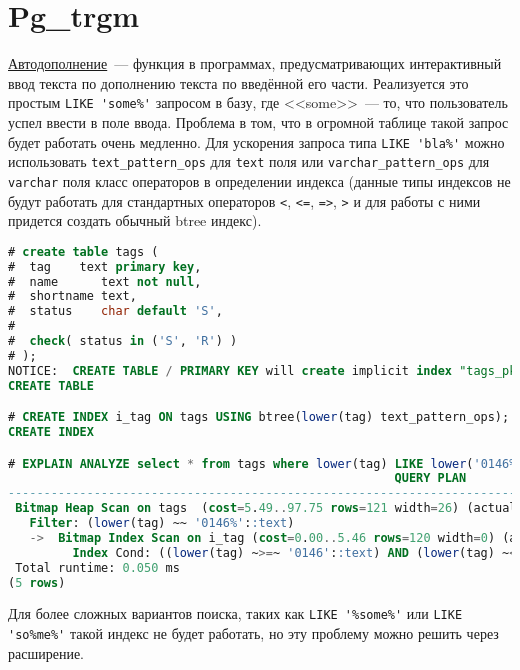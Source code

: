 \section{Pg\_trgm}

\href{https://ru.wikipedia.org/wiki/%D0%90%D0%B2%D1%82%D0%BE%D0%B4%D0%BE%D0%BF%D0%BE%D0%BB%D0%BD%D0%B5%D0%BD%D0%B8%D0%B5}{Автодополнение}~--- функция в программах, предусматривающих интерактивный ввод текста по дополнению текста по введённой его части. Реализуется это простым \lstinline!LIKE 'some%'! запросом в базу, где <<some>>~--- то, что пользователь успел ввести в поле ввода. Проблема в том, что в огромной таблице такой запрос будет работать очень медленно. Для ускорения запроса типа \lstinline!LIKE 'bla%'! можно использовать \lstinline!text_pattern_ops! для \lstinline!text! поля или \lstinline!varchar_pattern_ops! для \lstinline!varchar! поля класс операторов в определении индекса (данные типы индексов не будут работать для стандартных операторов \lstinline!<!, \lstinline!<=!, \lstinline!=>!, \lstinline!>! и для работы с ними придется создать обычный btree индекс).

\begin{lstlisting}[language=SQL,label=lst:pgtrgm1,caption=text\_pattern\_ops]
# create table tags (
#  tag    text primary key,
#  name      text not null,
#  shortname text,
#  status    char default 'S',
#
#  check( status in ('S', 'R') )
# );
NOTICE:  CREATE TABLE / PRIMARY KEY will create implicit index "tags_pkey" for table "tags"
CREATE TABLE

# CREATE INDEX i_tag ON tags USING btree(lower(tag) text_pattern_ops);
CREATE INDEX

# EXPLAIN ANALYZE select * from tags where lower(tag) LIKE lower('0146%');
                                                      QUERY PLAN
-----------------------------------------------------------------------------------------------------------------------
 Bitmap Heap Scan on tags  (cost=5.49..97.75 rows=121 width=26) (actual time=0.025..0.025 rows=1 loops=1)
   Filter: (lower(tag) ~~ '0146%'::text)
   ->  Bitmap Index Scan on i_tag (cost=0.00..5.46 rows=120 width=0) (actual time=0.016..0.016 rows=1 loops=1)
         Index Cond: ((lower(tag) ~>=~ '0146'::text) AND (lower(tag) ~<~ '0147'::text))
 Total runtime: 0.050 ms
(5 rows)
\end{lstlisting}

Для более сложных вариантов поиска, таких как \lstinline!LIKE '%some%'! или \lstinline!LIKE 'so%me%'! такой индекс не будет работать, но эту проблему можно решить через расширение.

